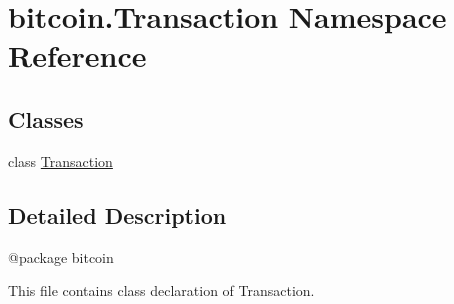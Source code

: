 \hypertarget{namespacebitcoin_1_1Transaction}{}\section{bitcoin.\+Transaction Namespace Reference}
\label{namespacebitcoin_1_1Transaction}
\subsection*{Classes}
\begin{DoxyCompactItemize}
\item 
class \hyperlink{classbitcoin_1_1Transaction_1_1Transaction}{Transaction}
\end{DoxyCompactItemize}


\subsection{Detailed Description}
\begin{DoxyVerb}@package bitcoin

This file contains class declaration of Transaction.
\end{DoxyVerb}
 